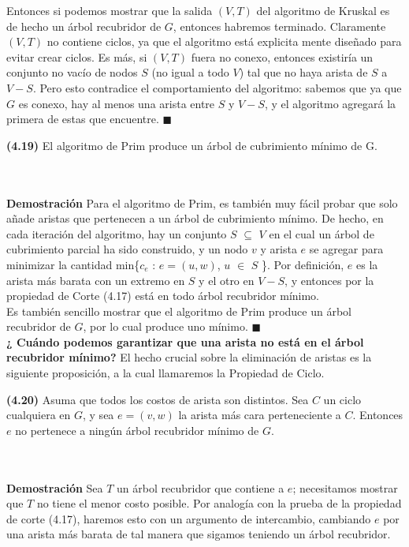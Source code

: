 \documentclass[a4paper]{article}
\begin{document}
Entonces si podemos mostrar que la salida $(V,T)$ del algoritmo de Kruskal es de hecho un árbol recubridor de $G$, entonces habremos terminado. Claramente $(V,T)$ no contiene ciclos, ya que el algoritmo está explicita mente diseñado para evitar crear ciclos. Es más, si $(V,T)$ fuera no conexo, entonces existiría un conjunto no vacío de nodos $S$ (no igual a todo $V$) tal que no haya arista de $S$ a $V-S$. Pero esto contradice el comportamiento del algoritmo: sabemos que ya que $G$ es conexo, hay al menos una arista entre $S$ y $V-S$, y el algoritmo agregará la primera de estas que encuentre. \(\blacksquare\)\\

\colorbox{mygray}{\parbox{15cm}{
\textbf{(4.19)}  El algoritmo de Prim produce un árbol de cubrimiento mínimo de G.}}\\\\

\textbf{Demostración} Para el algoritmo de Prim, es también muy fácil probar que solo añade aristas que pertenecen a un árbol de cubrimiento mínimo. De hecho, en cada iteración del algoritmo, hay un conjunto $S$ \(\subseteq\) $V$ en el cual un árbol de cubrimiento parcial ha sido construido, y un nodo $v$ y arista $e$ se agregar para minimizar la cantidad min\{$c_e$ : $e = (u, w)$, $u$ \(\in\) $S$ \}. Por definición, $e$ es la arista más barata con un extremo en $S$ y el otro en $V-S$, y entonces por la propiedad de Corte (4.17) está en todo árbol recubridor mínimo.\\

Es también sencillo mostrar que el algoritmo de Prim produce un árbol recubridor de $G$, por lo cual produce uno mínimo. \(\blacksquare\)\\
    
\textbf{¿ Cuándo podemos garantizar que una arista no está en el árbol recubridor mínimo?} El hecho crucial sobre la eliminación de aristas es la siguiente proposición, a la cual llamaremos la Propiedad de Ciclo.\\
    
\colorbox{mygray}{\parbox{15cm}{
\textbf{(4.20)}  Asuma que todos los costos de arista son distintos. Sea $C$ un ciclo cualquiera en $G$, y sea $e=(v,w)$ la arista más cara perteneciente a $C$. Entonces $e$ no pertenece a ningún árbol recubridor mínimo de $G$.}}\\\\

\textbf{Demostración} Sea $T$ un árbol recubridor que contiene a $e$; necesitamos mostrar que $T$ no tiene el menor costo posible. Por analogía con la prueba de la propiedad de corte (4.17), haremos esto con un argumento de intercambio, cambiando $e$ por una arista más barata de tal manera que sigamos teniendo un árbol recubridor.\\
\end{document}
